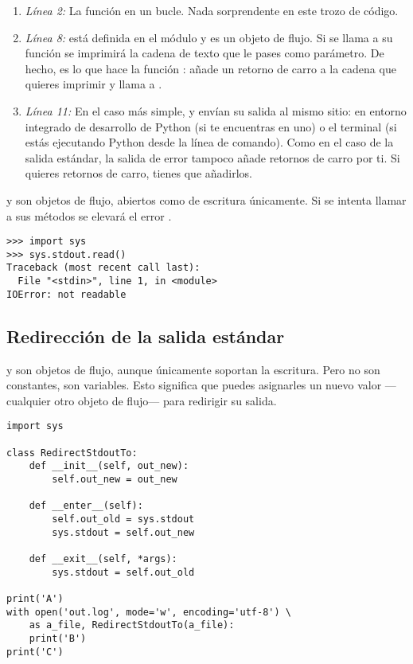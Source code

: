\begin{enumerate}

\item \emph{Línea 2:} La función  en un bucle. Nada sorprendente en este trozo de código.

\item \emph{Línea 8:}  está definida en el módulo  y es un objeto de flujo. Si se llama a su función  se imprimirá la cadena de texto que le pases como parámetro. De hecho, es lo que hace la función : añade un retorno de carro a la cadena que quieres imprimir y llama a .

\item \emph{Línea 11:} En el caso más simple,  y  envían su salida al mismo sitio: en entorno integrado de desarrollo de Python (si te encuentras en uno) o el terminal (si estás ejecutando Python desde la línea de comando). Como en el caso de la salida estándar, la salida de error tampoco añade retornos de carro por ti. Si quieres retornos de carro, tienes que añadirlos.

\end{enumerate}

 y  son objetos de flujo, abiertos como de escritura únicamente. Si se intenta llamar a sus métodos  se elevará el error .

\noindent\begin{minipage}{\textwidth}
\begin{lstlisting}[mathescape=True]
>>> import sys
>>> sys.stdout.read()
Traceback (most recent call last):
  File "<stdin>", line 1, in <module>
IOError: not readable
\end{lstlisting}
\end{minipage}

\subsection{Redirección de la salida estándar}

 y  son objetos de flujo, aunque únicamente soportan la escritura. Pero no son constantes, son variables. Esto significa que puedes asignarles un nuevo valor ---cualquier otro objeto de flujo--- para redirigir su salida.

\noindent\begin{minipage}{\textwidth}
\begin{lstlisting}[mathescape=True]
import sys

class RedirectStdoutTo:
    def __init__(self, out_new):
        self.out_new = out_new

    def __enter__(self):
        self.out_old = sys.stdout
        sys.stdout = self.out_new

    def __exit__(self, *args):
        sys.stdout = self.out_old

print('A')
with open('out.log', mode='w', encoding='utf-8') \
    as a_file, RedirectStdoutTo(a_file):
    print('B')
print('C')
\end{lstlisting}
\end{minipage}

